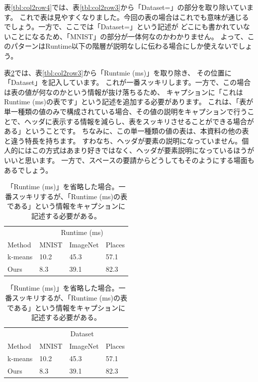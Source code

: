 \documentclass[uplatex,onecolumn,9pt,dvipdfmx]{jsarticle}
\newcommand{\Tref}[1]{表\ref{#1}}
\begin{document}
\Tref{tbl:col2row4}では、\Tref{tbl:col2row3}から「Dataset=」の部分を取り除いています。
これで表は見やすくなりました。今回の表の場合はこれでも意味が通じるでしょう。一方で、ここでは「Dataset=」という記述が
どこにも書かれていないことになるため、「MNIST」の部分が一体何なのかわかりません。
よって、このパターンはRuntime以下の階層が説明なしに伝わる場合にしか使えないでしょう。


\Tref{tbl:col2row5}では、\Tref{tbl:col2row3}から「Runtmie (ms)」を取り除き、
その位置に「Dataset」を記入しています。
これが一番スッキリします。一方で、この場合は表の値が何なのかという情報が抜け落ちるため、
キャプションに「これはRuntime (ms)の表です」という記述を追加する必要があります。
これは、「表が単一種類の値のみで構成されている場合、その値の説明をキャプションで行うことで、ヘッダに表示する情報を減らし、表をスッキリさせることができる場合がある」ということです。
ちなみに、この単一種類の値の表は、本資料の他の表と違う特長を持ちます。
すわなち、ヘッダが要素の説明になっていません。個人的にはこの方式はあまり好きではなく、ヘッダが要素説明になっているほうがいいと思います。
一方で、スペースの要請からどうしてもそのようにする場面もあるでしょう。


\begin{table}[h]
    \begin{minipage}{0.48\linewidth}
        \centering
        \begin{tabular}{@{}llll@{}} \toprule
                   & \multicolumn{3}{c}{Runtime (ms)}  \\ \cmidrule(l){2-4}
            Method & MNIST & ImageNet & Places \\ \midrule
            k-means   & 10.2 & 45.3 & 57.1 \\ 
            Ours      & 8.3  & 39.1 & 82.3 \\ \bottomrule   
        \end{tabular}
        \caption{「Dataset=」を省略した場合。見やすくなったが、「Dataset=」の情報はどこにも記述できない。}
        \label{tbl:col2row4}
    \end{minipage}
    \hfill
    \begin{minipage}{0.48\linewidth}
        \centering
        \begin{tabular}{@{}llll@{}} \toprule
                   & \multicolumn{3}{c}{Dataset}  \\ \cmidrule(l){2-4}
            Method & MNIST & ImageNet & Places \\ \midrule
            k-means   & 10.2 & 45.3 & 57.1 \\ 
            Ours      & 8.3  & 39.1 & 82.3 \\ \bottomrule   
        \end{tabular}
        \caption{「Runtime (ms)」を省略した場合。一番スッキリするが、「Runtime (ms)の表である」という情報をキャプションに記述する必要がある。}
        \label{tbl:col2row5}
    \end{minipage}
\end{table}
\end{document}
